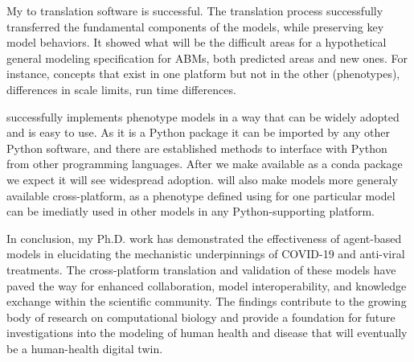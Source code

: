 

My \pscs to \ccds translation software is successful.  The translation process successfully transferred the fundamental components of the models, while preserving key model behaviors. It showed what will be the difficult areas for a hypothetical general modeling specification for ABMs, both predicted areas and new ones. For instance, concepts that exist in one platform but not in the other (phenotypes), differences in scale limits, run time differences.


\pcps successfully implements phenotype models in a way that can be widely adopted and is easy to use. As it is a Python package it can be imported by any other Python software, and there are established methods to interface with Python from other programming languages. After we make \pscs available as a conda package we expect it will see widespread adoption. \pscs will also make models more generaly available cross-platform, as a phenotype defined using \pcps for one particular model can be imediatly used in other models in any Python-supporting platform.


In conclusion, my Ph.D. work has demonstrated the effectiveness of agent-based models in elucidating the mechanistic underpinnings of COVID-19 and anti-viral treatments. The cross-platform translation and validation of these models have paved the way for enhanced collaboration, model interoperability, and knowledge exchange within the scientific community. The findings contribute to the growing body of research on computational biology and provide a foundation for future investigations into the modeling of human health and disease that will eventually be a human-health digital twin.


